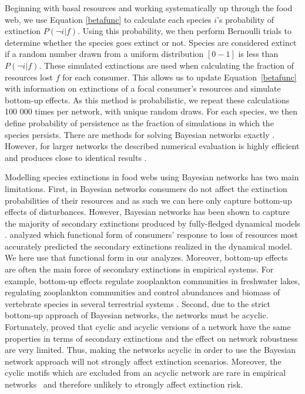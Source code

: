 \documentclass[12pt]{article}
\begin{document}
\begin{spacing}{2.0}
		
        Beginning with basal resources and working systematically up through the food web, we use Equation \ref{betafunc} to calculate each species $i$'s probability of extinction $P(\lnot i|f)$.
        Using this probability, we then perform Bernoulli trials to determine whether the species goes extinct or not. 
        Species are considered extinct if a random number drawn from a uniform distribution $[0-1]$ is less than $P(\lnot i|f)$.
        These simulated extinctions are used when calculating the fraction of resources lost $f$ for each consumer.
        This allows us to update Equation~\ref{betafunc} with information on extinctions of a focal consumer's resources and simulate bottom-up effects. As this method is probabilistic, we repeat these calculations 100 000 times per network, with unique random draws.
	    For each species, we then define probability of persistence as the fraction of simulations in which the species persists. There are methods for solving Bayesian networks exactly \citep{Eklof2013}.
	    However, for larger networks the described numerical evaluation is highly efficient and produces close to identical results \citep{Haussler2020}.
		
		Modelling species extinctions in food webs using Bayesian networks has two main limitations. 
		First, in Bayesian networks consumers do not affect the extinction probabilities of their resources and as such we can here only capture bottom-up effects of disturbances. 
		However, Bayesian networks has been shown to capture the majority of secondary extinctions produced by fully-fledged dynamical models \citep{Eklof2013}.
		\cite{Eklof2013} analyzed which functional form of consumers' response to loss of resources most accurately predicted the secondary extinctions realized in the dynamical model. 
		We here use that functional form in our analyzes.  
		Moreover, bottom-up effects are often the main force of secondary extinctions in empirical systems. 
		For example, bottom-up effects regulate zooplankton communities in freshwater lakes, regulating zooplankton communities \citep{li2020bottom} and control abundances and biomass of vertebrate species in several terrestrial systems \citep{Dobson2009food, Mduma1999food, Georgiadis2007}. 
		Second, due to the strict bottom-up approach of Bayesian networks, the networks must be acyclic.
		Fortunately, \cite{Allesina2009functional} proved that cyclic and acyclic versions of a network have the same properties in terms of secondary extinctions and the effect on network robustness are very limited. 
		Thus, making the networks acyclic in order to use the Bayesian network approach will not strongly affect extinction scenarios.
		Moreover, the cyclic motifs which are excluded from an acyclic network are rare in empirical networks~\citep{Stouffer2007} and therefore unlikely to strongly affect extinction risk.
	

\end{spacing}
\end{document}
